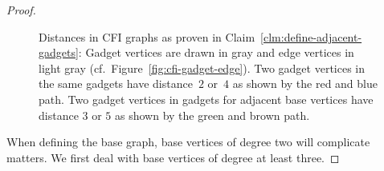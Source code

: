 \documentclass[]{lmcs}
\begin{document}
\begin{proof}
\begin{figure}
		\caption[Distances in CFI Graphs]{
			Distances in CFI graphs as proven in Claim~\ref{clm:define-adjacent-gadgets}:
			Gadget vertices are drawn in gray and edge vertices in light gray
			(cf.~Figure~\ref{fig:cfi-gadget-edge}).
			Two gadget vertices in the same gadgets have distance~$2$ or~$4$
			as shown by the red and blue path.
			Two gadget vertices in gadgets for adjacent base vertices have distance $3$ or $5$ as shown by the green and brown path.
		}
		\label{fig:cfi-distances}
	\end{figure}
	
	When defining the base graph, base vertices of degree two will complicate matters. We first deal with base vertices of degree at least three.
	

\end{proof}
\end{document}
